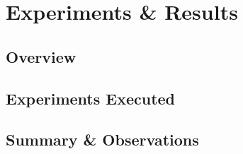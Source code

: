 \chapter{Experiments \& Results}\label{ch:results}

\section{Overview}

\section{Experiments Executed}

\section{Summary \& Observations}

